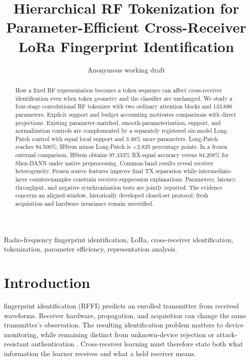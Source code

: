 \documentclass[journal]{IEEEtran}
\begin{document}
\title{Hierarchical RF Tokenization for Parameter-Efficient Cross-Receiver LoRa Fingerprint Identification}
\author{Anonymous working draft}
\maketitle
\begin{abstract}
How a fixed RF representation becomes a token sequence can affect cross-receiver identification even when token geometry and the classifier are unchanged. We study a four-stage convolutional RF tokenizer with two ordinary attention blocks and 133,690 parameters. Explicit support and budget accounting motivates comparisons with direct projections. Existing parameter-matched, smooth-parameterization, support, and normalization controls are complemented by a separately registered six-model Long-Patch control with equal local support and 3.48\% more parameters. Long-Patch reaches 94.500\%; HStem minus Long-Patch is +2.835 percentage points. In a frozen external comparison, HStem obtains 97.333\% RX-equal accuracy versus 94.208\% for Shen-DANN under native preprocessing. Common-band results reveal receiver heterogeneity. Frozen source features improve final TX separation while intermediate-layer counterexamples constrain receiver-suppression explanations. Parameters, latency, throughput, and negative synchronization tests are jointly reported. The evidence concerns an aligned-window, historically developed closed-set protocol; fresh acquisition and hardware invariance remain unverified.
\end{abstract}
\begin{IEEEkeywords}
Radio-frequency fingerprint identification, LoRa, cross-receiver identification, tokenization, parameter efficiency, representation analysis.
\end{IEEEkeywords}


\section{Introduction}
 fingerprint identification (RFFI) predicts an enrolled transmitter from received waveforms. Receiver hardware, propagation, and acquisition can change the same transmitter's observation. The resulting identification problem matters to device monitoring, while remaining distinct from unknown-device rejection or attack-resistant authentication \cite{zhang2025survey}. Cross-receiver learning must therefore state both what information the learner receives and what a held receiver means.
\end{document}
